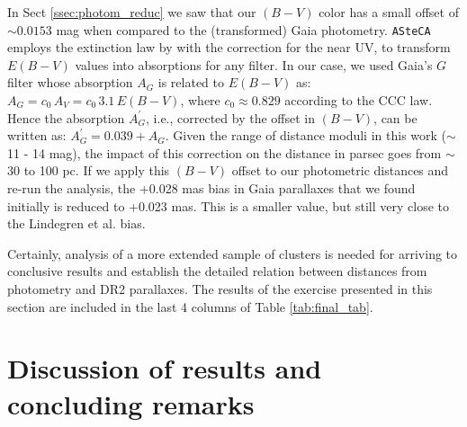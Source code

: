 \documentclass[draft]{aa}
\begin{document}

In Sect \ref{ssec:photom_reduc} we saw that our $(B-V)$ color has a small
offset of $\sim0.0153$ mag when compared to the (transformed) Gaia photometry.
\texttt{ASteCA} employs the extinction law by \citet[][CCC law]{Cardelli_1989}
with the \citet{Odonnell_1994} correction for the near UV, to transform $E
(B-V)$ values into absorptions for any filter.
In our case, we used Gaia's $G$ filter whose absorption $A_G$ is related to $E
(B-V)$ as: $A_G = c_0 \, A_V  = c_0 \, 3.1 \, E(B-V)$, where $c_0\approx0.829$
according to the CCC law. Hence the absorption $A_{G}^{\prime}$, i.e.,
corrected by the offset in $(B-V)$, can be written as: $A_{G}^
{\prime}=0.039+A_G$.
Given the range of distance moduli in this work ($\sim$11 - 14 mag), the impact
of this correction on the distance in parsec goes from $\sim$30 to 100 pc.
If we apply this $(B-V)$ offset to our photometric distances and re-run the
analysis, the +0.028 mas bias in Gaia parallaxes that we found
initially is reduced to +0.023 mas. This is a smaller value, but still very
close to the Lindegren et al. bias.

Certainly, analysis of a more extended sample of clusters is needed for
arriving to conclusive results and establish the detailed relation between
distances from photometry and DR2 parallaxes. The results of the exercise
presented in this section are included in the last 4 columns of Table 
\ref{tab:final_tab}.




\section{Discussion of results and concluding remarks}
\label{sec:results_concl}
\end{document}
